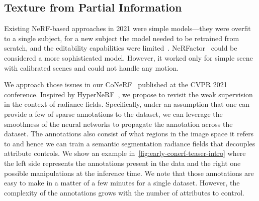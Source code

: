   
  \subsection{Texture from Partial Information}
    Existing NeRF-based approaches in 2021 were simple models---they were
    overfit to a single subject, for a new subject the model needed to be
    retrained from scratch, and the editability capabilities were
    limited~\cite{liu2021editing}.
    NeRFactor~\cite{zhang2021nerfactor} could be considered a more
    sophisticated model.
    However, it worked only for simple scene with calibrated scenes and could
    not handle any motion.

    We approach those issues in our CoNeRF~\cite{kania2022conerf} published at
    the CVPR 2021 conference.
    Inspired by HyperNeRF~\cite{park2021hypernerf}, we propose to revisit the
    weak supervision in the context of radiance fields.
    Specifically, under an assumption that one can provide a few of sparse
    annotations to the dataset, we can leverage the smoothness of the neural
    networks to propagate the annotation across the dataset.
    The annotations also consist of what regions in the image space it refers
    to and hence we can train a semantic segmentation radiance fields that
    decouples attribute controls.
    We show an example in~\cref{fig:early-conerf-teaser-intro} where the left
    side represents the annotations present in the data and the right one
    possible manipulations at the inference time.
    We note that those annotations are easy to make in a matter of a few
    minutes for a single dataset.
    However, the complexity of the annotations grows with the number of
    attributes to control.

